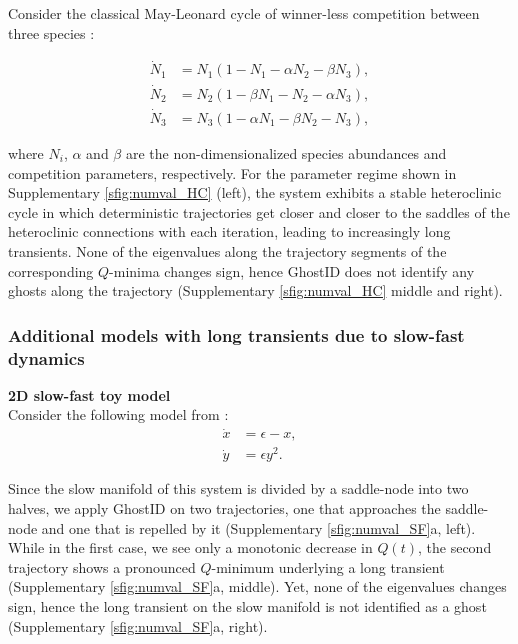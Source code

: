 \documentclass{article}
\theoremstyle{definition}
\begin{document}
\begin{refsection}
Consider the classical May-Leonard cycle of winner-less competition between three species \cite{May1975}:

\begin{align*}
    \dot{N}_1 &= N_1 \left(1 - N_1 - \alpha N_2 - \beta N_3\right), \\
    \dot{N}_2 &= N_2 \left(1 - \beta N_1 - N_2 - \alpha N_3\right), \nonumber \\
    \dot{N}_3 &= N_3 \left(1 - \alpha N_1 - \beta N_2 - N_3\right), \nonumber
\end{align*}

where $N_i$, $\alpha$ and $\beta$ are the non-dimensionalized species abundances and competition parameters, respectively. For the parameter regime shown in Supplementary \autoref{sfig:numval_HC} (left), the system exhibits a stable heteroclinic cycle in which deterministic trajectories get closer and closer to the saddles of the heteroclinic connections with each iteration, leading to increasingly long transients. None of the eigenvalues along the trajectory segments of the corresponding $Q$-minima changes sign, hence GhostID does not identify any ghosts along the trajectory (Supplementary \autoref{sfig:numval_HC} middle and right).

\subsubsection{Additional models with long transients due to slow-fast dynamics}\label{subsection:numVal_slowFast}

\textbf{2D slow-fast toy model}\\
Consider the following model from \cite{Kuehn_2015}:
\begin{align*}
    \dot{x} &= \epsilon - x, \\
    \dot{y} &= \epsilon y^2. \nonumber
\end{align*}

Since the slow manifold of this system is divided by a saddle-node into two halves, we apply GhostID on two trajectories, one that approaches the saddle-node and one that is repelled by it (Supplementary \autoref{sfig:numval_SF}a, left). While in the first case, we see only a monotonic decrease in $Q(t)$, the second trajectory shows a pronounced $Q$-minimum underlying a long transient (Supplementary \autoref{sfig:numval_SF}a, middle). Yet, none of the eigenvalues changes sign, hence the long transient on the slow manifold is not identified as a ghost (Supplementary \autoref{sfig:numval_SF}a, right).\\


\end{refsection}
\end{document}
